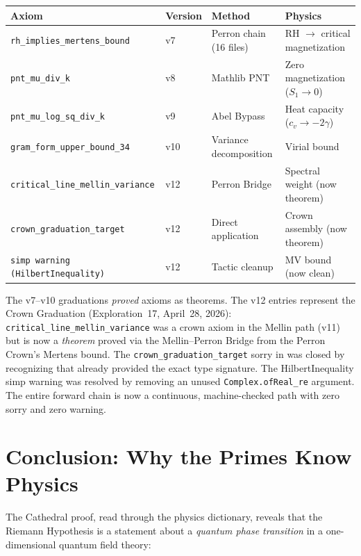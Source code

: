 \documentclass[11pt,a4paper]{article}
\begin{document}
\begin{center}
\small
\begin{tabular}{@{}llll@{}}
\toprule
\textbf{Axiom} & \textbf{Version} & \textbf{Method} & \textbf{Physics} \\
\midrule
\texttt{rh\_implies\_mertens\_bound} & v7 & Perron chain (16 files) & RH $\to$ critical magnetization \\
\texttt{pnt\_mu\_div\_k} & v8 & Mathlib PNT & Zero magnetization ($S_1 \to 0$) \\
\texttt{pnt\_mu\_log\_sq\_div\_k} & v9 & Abel Bypass & Heat capacity ($c_v \to -2\gamma$) \\
\texttt{gram\_form\_upper\_bound\_34} & v10 & Variance decomposition & Virial bound \\
\texttt{critical\_line\_mellin\_variance} & v12 & Perron Bridge & Spectral weight (now theorem) \\
\texttt{crown\_graduation\_target} & v12 & Direct application & Crown assembly (now theorem) \\
\texttt{simp warning (HilbertInequality)} & v12 & Tactic cleanup & MV bound (now clean) \\
\bottomrule
\end{tabular}
\end{center}

The v7--v10 graduations \emph{proved} axioms as theorems. The v12 entries
represent the Crown Graduation (Exploration~17, April~28, 2026):
\texttt{critical\_line\_mellin\_variance} was a crown axiom
in the Mellin path (v11) but is now a \emph{theorem} proved via the
Mellin--Perron Bridge from the Perron Crown's Mertens bound.
The \texttt{crown\_graduation\_target} sorry in 
was closed by recognizing that 
already provided the exact type signature. The HilbertInequality simp warning
was resolved by removing an unused \texttt{Complex.ofReal\_re} argument.
The entire forward chain is now a continuous, machine-checked path with
zero sorry and zero warning.

\section{Conclusion: Why the Primes Know Physics}

The Cathedral proof, read through the physics dictionary, reveals that
the Riemann Hypothesis is a statement about a \emph{quantum phase
transition} in a one-dimensional quantum field theory:
\end{document}
